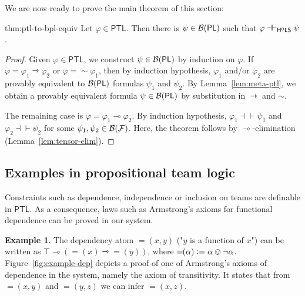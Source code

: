 \documentclass[a4paper,english,fleqn,11pt,final]{scrartcl}
\newcommand{\negg}{{\sim}}
\newcommand{\dep}[1]{{=\!\!(#1)}}
\newcommand{\logic}[1]{\ensuremath{\mathsf{#1}}\xspace}
\newcommand{\PL}{\logic{PL}}
\newcommand{\PTL}{\logic{PTL}}
\newcommand{\calB}{\protect\ensuremath{\mathcal{B}}}
\newcommand{\calF}{\protect\ensuremath{\mathcal{F}}}
\newcommand{\sfS}{\protect\ensuremath{\mathsf{S}}}
\newcommand{\sfH}{\protect\ensuremath{\mathsf{H}}}
\newcommand{\sfL}{\protect\ensuremath{\mathsf{L}}}
\providecommand{\dfn}{\mathrel{\mathop:}=}
\newcommand{\limp}{\multimap}
\newcommand{\timp}{\rightarrowtriangle}
\newcommand{\eqpr}{\dashv\vdash}
\theoremstyle{plain}
\theoremstyle{definition}
\newtheorem{example}[theorem]{Example}
\begin{document}
We are now ready to prove the main theorem of this section:

\begin{reptheorem}{thm:ptl-to-bpl-equiv}
Let $\varphi \in \PTL$.
Then there is $\psi \in \calB(\PL)$ such that $\varphi \eqpr_{\sfH^0\sfL\sfS} \psi$.
\end{reptheorem}
\begin{proof}
Given $\varphi \in \PTL$, we construct $\psi \in \calB(\PL)$ by induction on $\varphi$.
If $\varphi = \varphi_1 \timp \varphi_2$ or $\varphi = \negg\varphi_1$, then by induction hypothesis, $\varphi_1$ and/or $\varphi_2$ are provably equivalent to $\calB(\PL)$ formulas $\psi_1$ and $\psi_2$.
By Lemma~\ref{lem:meta-ptl}, we obtain a provably equivalent formula $\psi \in \calB(\PL)$ by substitution in $\timp$ and $\negg$.

The remaining case is $\varphi = \varphi_1 \limp \varphi_2$.
By induction hypothesis, $\varphi_1 \eqpr \psi_1$ and $\varphi_2\eqpr \psi_2$ for some $\psi_1,\psi_2 \in\calB(\calF)$.
Here, the theorem follows by $\limp$-elimination (Lemma~\ref{lem:tensor-elim}).
\end{proof}



\subsection{Examples in propositional team logic}

Constraints such as dependence, independence or inclusion on teams are definable in $\PTL$.
As a consequence, laws such as Armstrong's axioms for functional dependence can be proved in our system.

\begin{example}
The dependency atom $\dep{x,y}$ ("$y$ is a function of $x$") can be written as $\top \limp (\dep{x} \timp \dep{y})$, where $\dep{\alpha} \dfn \alpha \ovee \neg \alpha$.
Figure~\ref{fig:example-dep} depicts a proof of one of Armstrong's axioms of dependence \cite{armstrong} in the system, namely the axiom of transitivity.
It states that from $\dep{x,y}$ and $\dep{y,z}$ we can infer $\dep{x,z}$.
\end{example}
\end{document}
